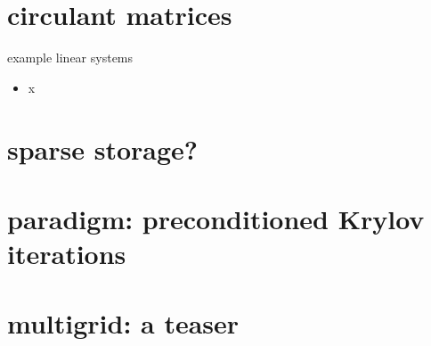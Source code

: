 \documentclass[10pt,hyperref]{beamer}
\begin{document}
\section{circulant matrices}

\begin{frame}{example linear systems}

\begin{itemize}
\item x
\end{itemize}
\end{frame}

\section{sparse storage?}

\section{paradigm: preconditioned Krylov iterations}

\section{multigrid: a teaser}
\end{document}
